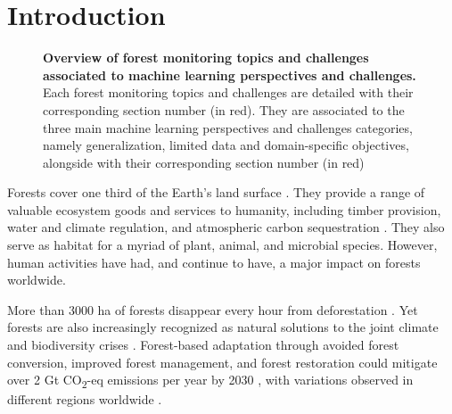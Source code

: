 \documentclass{CUP-JNL-DTM}%
\newcommand{\AOc}[1]{\textcolor{cyan}{[\textbf{Art}: #1]}}
\theoremstyle{definition}
\numberwithin{equation}{section}
\begin{document}

\localtableofcontents

\section[Introduction]{Introduction}


\begin{figure}[t]%
{\caption{\textbf{Overview of forest monitoring topics and challenges associated to machine learning perspectives and challenges.} Each forest monitoring topics and challenges are detailed with their corresponding section number (in red). They are associated to the three main machine learning perspectives and challenges categories, namely generalization, limited data and domain-specific objectives, alongside with their corresponding section number (in red)}
\label{fig:challenges}}
\end{figure}


Forests cover one third of the Earth's land surface \cite{the_food_and_agriculture_organization_of_the_united_nations_global_2020}.
They provide a range of valuable ecosystem goods and services to humanity, including timber provision, water and climate regulation, and atmospheric carbon sequestration \cite{assessment_millennium_2001, bonan_forests_2008}. 
They also serve as habitat for a myriad of plant, animal, and microbial species. 
However, human activities have had, and continue to have, a major impact on forests worldwide. 

More than 3000 ha of forests disappear every hour from deforestation \cite{the_food_and_agriculture_organization_of_the_united_nations_global_2020, hansen_high-resolution_2013}.
Yet forests are also increasingly recognized as natural solutions to the joint climate and biodiversity crises \cite{griscom_natural_2017, griscom_national_2020, drever_natural_2021}.
Forest-based adaptation through avoided forest conversion, improved forest management, and forest restoration could mitigate over 2 Gt CO\textsubscript{2}-eq emissions per year by 2030 \cite{intergovernmental_panel_on_climate_change_ipcc_climate_2023},
with variations observed in different regions worldwide \cite{griscom_natural_2017, bastin_global_2019, busch_potential_2019, griscom_national_2020, drever_natural_2021}.
\end{document}
